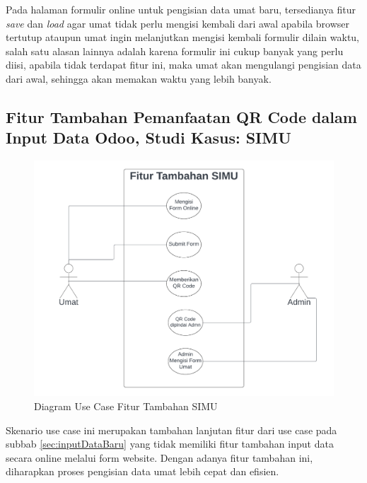 Pada halaman formulir online untuk pengisian data umat baru, tersedianya fitur \textit{save} dan \textit{load} agar umat tidak perlu mengisi kembali dari awal apabila browser tertutup ataupun umat ingin melanjutkan mengisi kembali formulir dilain waktu, salah satu alasan lainnya adalah karena formulir ini cukup banyak yang perlu diisi, apabila tidak terdapat fitur ini, maka umat akan mengulangi pengisian data dari awal, sehingga akan memakan waktu yang lebih banyak. 

\subsection{Fitur Tambahan Pemanfaatan QR Code dalam Input Data Odoo, Studi Kasus: SIMU}
\label{sec:fiturTambahan}

\begin{figure}[H]
	\centering
	\includegraphics[scale=0.7]{Gambar/fiturTambahan.png}
	\caption{Diagram Use Case Fitur Tambahan SIMU} 
	\label{fig:fiturTambahan}
\end{figure}

Skenario use case ini merupakan tambahan lanjutan fitur dari use case pada subbab \ref{sec:inputDataBaru} yang tidak memiliki fitur tambahan input data secara online melalui form website. Dengan adanya fitur tambahan ini, diharapkan proses pengisian data umat lebih cepat dan efisien.